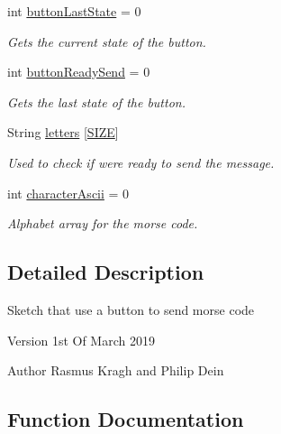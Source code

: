 \begin{DoxyCompactItemize}
int \mbox{\hyperlink{_arduino_morse_client_8ino_a986feb0ed834c2e1498a4158aad806c4}{button\+Last\+State}} = 0
\begin{DoxyCompactList}\small\item\em Gets the current state of the button. \end{DoxyCompactList}\item 
\mbox{\label{_arduino_morse_client_8ino_a344481de02db7e9fd3b2ed53e1380522}} 
int \mbox{\hyperlink{_arduino_morse_client_8ino_a344481de02db7e9fd3b2ed53e1380522}{button\+Ready\+Send}} = 0
\begin{DoxyCompactList}\small\item\em Gets the last state of the button. \end{DoxyCompactList}\item 
String \mbox{\hyperlink{_arduino_morse_client_8ino_a7049c41d427471a21afc889cee0f7df9}{letters}} \mbox{[}\mbox{\hyperlink{_arduino_morse_client_8ino_a70ed59adcb4159ac551058053e649640}{S\+I\+ZE}}\mbox{]}
\begin{DoxyCompactList}\small\item\em Used to check if we\textquotesingle{}re ready to send the message. \end{DoxyCompactList}\item 
\mbox{\label{_arduino_morse_client_8ino_a35e7f5e19b853b70909233317cae7103}} 
int \mbox{\hyperlink{_arduino_morse_client_8ino_a35e7f5e19b853b70909233317cae7103}{character\+Ascii}} = 0
\begin{DoxyCompactList}\small\item\em Alphabet array for the morse code. \end{DoxyCompactList}\end{DoxyCompactItemize}


\subsection{Detailed Description}
Sketch that use a button to send morse code

\begin{DoxyVersion}{Version}
1st Of March 2019 
\end{DoxyVersion}
\begin{DoxyAuthor}{Author}
Rasmus Kragh and Philip Dein 
\end{DoxyAuthor}


\subsection{Function Documentation}
\mbox{\label{_arduino_morse_client_8ino_a1fe60c5a5dee3af1ed1e0cf380175333}} 
